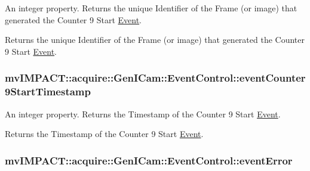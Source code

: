 An integer property. Returns the unique Identifier of the Frame (or image) that generated the Counter 9 Start \hyperlink{classmv_i_m_p_a_c_t_1_1acquire_1_1_event}{Event}. 

Returns the unique Identifier of the Frame (or image) that generated the Counter 9 Start \hyperlink{classmv_i_m_p_a_c_t_1_1acquire_1_1_event}{Event}. \hypertarget{classmv_i_m_p_a_c_t_1_1acquire_1_1_gen_i_cam_1_1_event_control_aaf120576e5306df41e419ddca6a18fa0}{
\subsubsection[{event\+Counter9\+Start\+Timestamp}]{ mv\+I\+M\+P\+A\+C\+T\+::acquire\+::\+Gen\+I\+Cam\+::\+Event\+Control\+::event\+Counter9\+Start\+Timestamp}}\label{classmv_i_m_p_a_c_t_1_1acquire_1_1_gen_i_cam_1_1_event_control_aaf120576e5306df41e419ddca6a18fa0}


An integer property. Returns the Timestamp of the Counter 9 Start \hyperlink{classmv_i_m_p_a_c_t_1_1acquire_1_1_event}{Event}. 

Returns the Timestamp of the Counter 9 Start \hyperlink{classmv_i_m_p_a_c_t_1_1acquire_1_1_event}{Event}. \hypertarget{classmv_i_m_p_a_c_t_1_1acquire_1_1_gen_i_cam_1_1_event_control_a6375c2352bb93b3f9f8c641d009686c7}{
\subsubsection[{event\+Error}]{ mv\+I\+M\+P\+A\+C\+T\+::acquire\+::\+Gen\+I\+Cam\+::\+Event\+Control\+::event\+Error}}\label{classmv_i_m_p_a_c_t_1_1acquire_1_1_gen_i_cam_1_1_event_control_a6375c2352bb93b3f9f8c641d009686c7}


